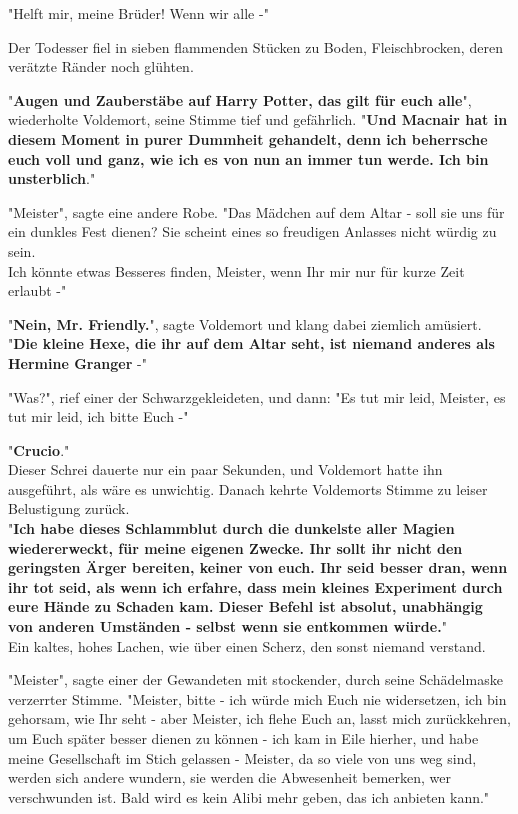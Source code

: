 {"Helft mir, meine Brüder! Wenn wir alle -"

Der Todesser fiel in sieben flammenden Stücken zu Boden, Fleischbrocken, deren verätzte Ränder noch glühten.

"\textbf{Augen und Zauberstäbe auf Harry Potter, das gilt für euch alle}", wiederholte Voldemort, seine Stimme tief und gefährlich. "\textbf{Und Macnair hat in diesem Moment in purer Dummheit gehandelt, denn ich beherrsche euch voll und ganz, wie ich es von nun an immer tun werde. Ich bin unsterblich}."

"Meister", sagte eine andere Robe. "Das Mädchen auf dem Altar - soll sie uns für ein dunkles Fest dienen? Sie scheint eines so freudigen Anlasses nicht würdig zu sein.\\ Ich könnte etwas Besseres finden, Meister, wenn Ihr mir nur für kurze Zeit erlaubt -"

"\textbf{Nein, Mr. Friendly.}", sagte Voldemort und klang dabei ziemlich amüsiert. "\textbf{Die kleine Hexe, die ihr auf dem Altar seht, ist niemand anderes als Hermine Granger} -"

"Was?", rief einer der Schwarzgekleideten, und dann: "Es tut mir leid, Meister, es tut mir leid, ich bitte Euch -"

"\textbf{Crucio}."\\ Dieser Schrei dauerte nur ein paar Sekunden, und Voldemort hatte ihn ausgeführt, als wäre es unwichtig. Danach kehrte Voldemorts Stimme zu leiser Belustigung zurück.\\ "\textbf{Ich habe dieses Schlammblut durch die dunkelste aller Magien wiedererweckt, für meine eigenen Zwecke. Ihr sollt ihr nicht den geringsten Ärger bereiten, keiner von euch. Ihr seid besser dran, wenn ihr tot seid, als wenn ich erfahre, dass mein kleines Experiment durch eure Hände zu Schaden kam. Dieser Befehl ist absolut, unabhängig von anderen Umständen - selbst wenn sie entkommen würde.}"\\ Ein kaltes, hohes Lachen, wie über einen Scherz, den sonst niemand verstand.

"Meister", sagte einer der Gewandeten mit stockender, durch seine Schädelmaske verzerrter Stimme. "Meister, bitte - ich würde mich Euch nie widersetzen, ich bin gehorsam, wie Ihr seht - aber Meister, ich flehe Euch an, lasst mich zurückkehren, um Euch später besser dienen zu können - ich kam in Eile hierher, und habe meine Gesellschaft im Stich gelassen - Meister, da so viele von uns weg sind, werden sich andere wundern, sie werden die Abwesenheit bemerken, wer verschwunden ist. Bald wird es kein Alibi mehr geben, das ich anbieten kann."

}
